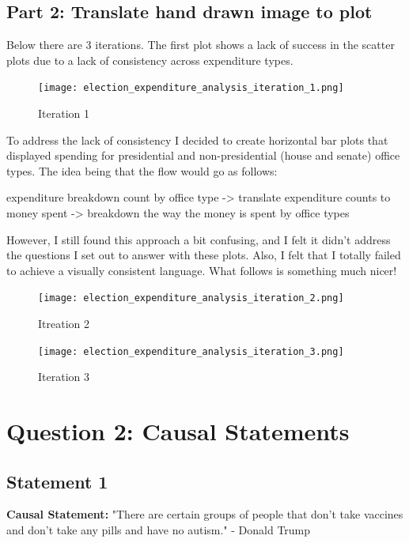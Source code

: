 \documentclass[12pt]{article}
\begin{document}
\subsection*{Part 2: Translate hand drawn image to plot}

Below there are 3 iterations. The first plot shows a lack of success in the scatter plots due to a lack of consistency across expenditure types.

\begin{figure}[htbp]
    \centering
    \texttt{[image: election\_expenditure\_analysis\_iteration\_1.png]}
    \caption{Iteration 1}
    \label{fig:myfigure}
\end{figure}

To address the lack of consistency I decided to create horizontal bar plots that displayed spending for presidential and non-presidential (house and senate) office types. The idea being that the flow would go as follows:

expenditure breakdown count by office type -> translate expenditure counts to money spent -> breakdown the way the money is spent by office types

However, I still found this approach a bit confusing, and I felt it didn't address the questions I set out to answer with these plots. Also, I felt that I totally failed to achieve a visually consistent language. What follows is something much nicer!

\begin{figure}[htbp]
    \centering
    \texttt{[image: election\_expenditure\_analysis\_iteration\_2.png]}
    \caption{Itreation 2}
    \label{fig:myfigure}
\end{figure}

\begin{figure}[H]
    \centering
    \texttt{[image: election\_expenditure\_analysis\_iteration\_3.png]}
    \caption{Iteration 3}
    \label{fig:myfigure}
\end{figure}

\section*{Question 2: Causal Statements}

\subsection*{Statement 1}

\textbf{Causal Statement:} "There are certain groups of people that don't take vaccines and don't take any pills and have no autism." - Donald Trump
\end{document}
